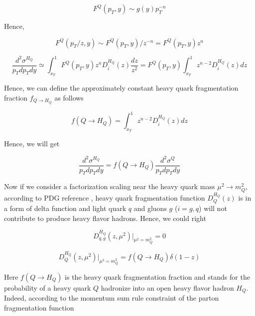 \begin{equation}
F^Q(p_T, y) \sim g(y) p_T^{-n}
\end{equation}

Hence,

\begin{equation}
F^Q(p_T/z, y) \sim F^Q(p_T, y)/z^{-n} = F^Q(p_T, y) z^n
\end{equation}


\begin{equation}
\frac{d^2\sigma^{H_Q}}{p_T dp_Tdy} \simeq \int_{x_T}^1 F^Q(p_T, y)  z^{n} D^{H_Q}_{i}(z) \frac{dz}{z^2} =F^Q(p_T, y)  \int_{x_T}^1  z^{n-2} D^{H_Q}_{i}(z) dz
\end{equation}



Hence, we can define the approximately constant heavy quark fragmentation fraction $f_{Q \rightarrow H_Q}$ as follows

\begin{equation}
f(Q \rightarrow H_Q) = \int_{x_T}^1 z^{n-2} D^{H_Q}_{i}(z) dz
\end{equation}

Hence, we will get 

\begin{equation}
\frac{d^2\sigma^{H_Q}}{p_T dp_T dy} = f(Q \rightarrow H_Q)  \frac{d^2\sigma^Q}{p_T dp_T dy}
\end{equation}

\fi

Now if we consider a factorization scaling near the heavy quark mass $\mu^2 \rightarrow m_Q^2$, according to PDG reference \cite{AlphaTheoEx}, heavy quark fragmentation function $D_Q^{H_Q}(z)$ is in a form of delta function and light quark $q$ and gluons $g$ ($i = g, q$) will not contribute to produce heavy flavor hadrons. Hence, we could right

\begin{equation}
D^{H_Q}_{q,g}(z,\mu^2)|_{\mu^2=m_Q^2} = 0
\end{equation}

\begin{equation}
D^{H_Q}_{Q}(z,\mu^2)|_{\mu^2=m_Q^2} = f(Q \rightarrow H_Q) \delta(1 - z)
\end{equation}

Here $f({Q \rightarrow H_Q})$ is the heavy quark fragmentation fraction and stands for the probability of a heavy quark $Q$ hadronize into an open heavy flavor hadron $H_Q$. Indeed, according to the momentum sum rule constraint of the parton fragmentation function \cite{QCDFFunc}

